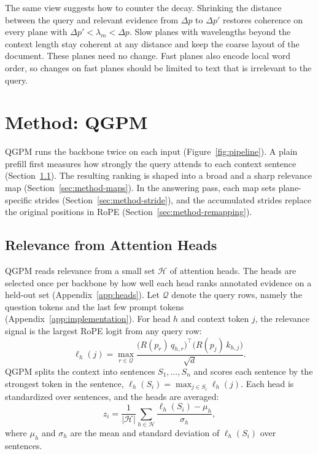 \documentclass[11pt]{article}
\begin{document}
The same view suggests how to counter the decay. Shrinking the distance between the query and relevant evidence from $\Delta p$ to $\Delta p'$ restores coherence on every plane with $\Delta p' < \lambda_m < \Delta p$. Slow planes with wavelengths beyond the context length stay coherent at any distance and keep the coarse layout of the document. These planes need no change. Fast planes also encode local word order, so changes on fast planes should be limited to text that is irrelevant to the query.



\section{Method: QGPM}
\label{sec:method}

QGPM runs the backbone twice on each input (Figure~\ref{fig:pipeline}). A plain prefill first measures how strongly the query attends to each context sentence (Section~\ref{sec:method-scoring}). The resulting ranking is shaped into a broad and a sharp relevance map (Section~\ref{sec:method-maps}). In the answering pass, each map sets plane-specific strides (Section~\ref{sec:method-stride}), and the accumulated strides replace the original positions in RoPE (Section~\ref{sec:method-remapping}).

\subsection{Relevance from Attention Heads}
\label{sec:method-scoring}

QGPM reads relevance from a small set $\mathcal{H}$ of attention heads. The heads are selected once per backbone by how well each head ranks annotated evidence on a held-out set (Appendix~\ref{app:heads}). Let $\mathcal{Q}$ denote the query rows, namely the question tokens and the last few prompt tokens (Appendix~\ref{app:implementation}). For head $h$ and context token $j$, the relevance signal is the largest RoPE logit from any query row:
\begin{equation}
\ell_h(j) = \max_{r \in \mathcal{Q}} \frac{\big(R(p_r)\, q_{h,r}\big)^\top \big(R(p_j)\, k_{h,j}\big)}{\sqrt{d}}.
\label{eq:head-signal}
\end{equation}
QGPM splits the context into sentences $S_1, \ldots, S_n$ and scores each sentence by the strongest token in the sentence, $\ell_h(S_i) = \max_{j \in S_i} \ell_h(j)$. Each head is standardized over sentences, and the heads are averaged:
\begin{equation}
z_i = \frac{1}{|\mathcal{H}|} \sum_{h \in \mathcal{H}} \frac{\ell_h(S_i) - \mu_h}{\sigma_h},
\label{eq:fusion}
\end{equation}
where $\mu_h$ and $\sigma_h$ are the mean and standard deviation of $\ell_h(S_i)$ over sentences.
\end{document}
